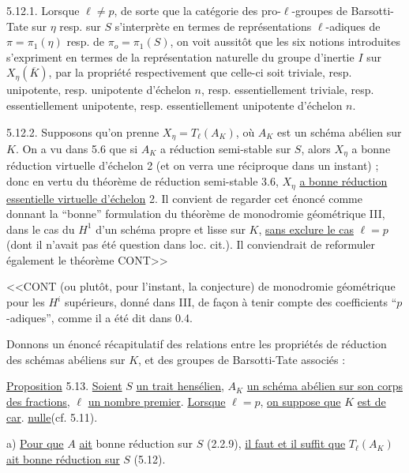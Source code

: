 5.12.1.  Lorsque $\ell \neq p$, de sorte que la catégorie des pro-$\ell$-groupes de Barsotti-Tate sur $\eta$ resp. sur $S$ s'interprète en termes de représentations $\ell$-adiques de $\pi = \pi_1(\eta)$ resp. de $\pi_o = \pi_1(S)$, on voit aussitôt que les six notions introduites s'expriment en termes de la représentation naturelle du groupe d'inertie $I$ sur $X_\eta(\overline{K})$, par la propriété respectivement que celle-ci soit triviale, resp. unipotente, resp. unipotente d'échelon $n$, resp. essentiellement triviale, resp. essentiellement unipotente, resp. essentiellement unipotente d'échelon $n$.

5.12.2.  Supposons qu'on prenne $X_\eta = T_\ell(A_K)$, où $A_K$ est un schéma abélien sur $K$. On a vu dans 5.6 que si $A_K$ a réduction semi-stable sur $S$, alors $X_\eta$ a bonne réduction virtuelle d'échelon 2 (et on verra une réciproque dans un instant) ; donc en vertu du théorème de réduction semi-stable 3.6, $X_\eta$ \underline{a bonne réduction essentielle virtuelle d'échelon} 2. Il convient de regarder cet énoncé comme donnant la ``bonne'' formulation du théorème de monodromie géométrique III\hspace{2em}, dans le cas du $H^1$ d'un schéma propre et lisse sur $K$, \underline{sans exclure le cas} $\ell = p$ (dont il n'avait pas été question dans loc. cit.). Il conviendrait de reformuler également le théorème CONT>>



<<CONT (ou plutôt, pour l'instant, la conjecture) de monodromie géométrique pour les $H^i$ supérieurs, donné dans III\hspace{2em}, de façon à tenir compte des coefficients ``$p$-adiques'', comme il a été dit dans 0.4.

Donnons un énoncé récapitulatif des relations entre les propriétés de réduction des schémas abéliens sur $K$, et des groupes de Barsotti-Tate associés :

\underline{Proposition} 5.13.  \underline{Soient} $S$ \underline{un trait hensélien}, $A_K$ \underline{un schéma abélien sur son corps des fractions}, $\ell$ \underline{un nombre premier}. \underline{Lorsque} $\ell = p$, \underline{on suppose que} $K$ \underline{est de car}. \underline{nulle}(cf. 5.11).

a) \underline{Pour que} $A$ \underline{ait} bonne réduction sur $S$ (2.2.9), \underline{il faut et il suffit que} $T_\ell(A_K)$ \underline{ait bonne réduction sur} $S$ (5.12).


